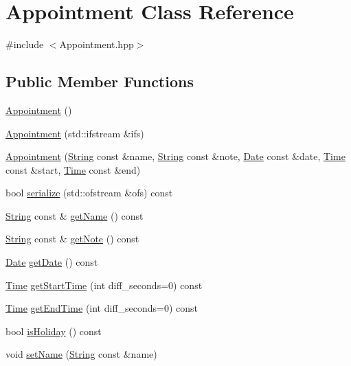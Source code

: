\hypertarget{classAppointment}{}\section{Appointment Class Reference}
\label{classAppointment}


{\ttfamily \#include $<$Appointment.\+hpp$>$}

\subsection*{Public Member Functions}
\begin{DoxyCompactItemize}
\item 
\hyperlink{classAppointment_a6f5ebbe07e02feaab6600c0f6297e694}{Appointment} ()
\item 
\hyperlink{classAppointment_a3b5b82331c630dcce3b1e724d0e6c48e}{Appointment} (std\+::ifstream \&ifs)
\item 
\hyperlink{classAppointment_a5ad76b006f94741008318f0a5053b7a0}{Appointment} (\hyperlink{classString}{String} const \&name, \hyperlink{classString}{String} const \&note, \hyperlink{classDate}{Date} const \&date, \hyperlink{classTime}{Time} const \&start, \hyperlink{classTime}{Time} const \&end)
\item 
bool \hyperlink{classAppointment_a2542a8dd24e926a2531f1d88bbf4dd88}{serialize} (std\+::ofstream \&ofs) const
\item 
\hyperlink{classString}{String} const  \& \hyperlink{classAppointment_ab2cbd469ff67c37c34a91c02a1ba9d35}{get\+Name} () const
\item 
\hyperlink{classString}{String} const  \& \hyperlink{classAppointment_aaf6078fe8f092e321a38d173bc7093c3}{get\+Note} () const
\item 
\hyperlink{classDate}{Date} \hyperlink{classAppointment_ac4f82720deaa4daf6679d1c60fadfb67}{get\+Date} () const
\item 
\hyperlink{classTime}{Time} \hyperlink{classAppointment_a577870c4d05eb584d58c61c98b9b65a0}{get\+Start\+Time} (int diff\+\_\+seconds=0) const
\item 
\hyperlink{classTime}{Time} \hyperlink{classAppointment_a5ba3b128ad963c9676af3fb199b98613}{get\+End\+Time} (int diff\+\_\+seconds=0) const
\item 
bool \hyperlink{classAppointment_a0307e814d106ba2b2314a28a9701efae}{is\+Holiday} () const
\item 
void \hyperlink{classAppointment_a65ff6f9a246d1bf437cb0be725841a84}{set\+Name} (\hyperlink{classString}{String} const \&name)

\end{DoxyCompactItemize}
